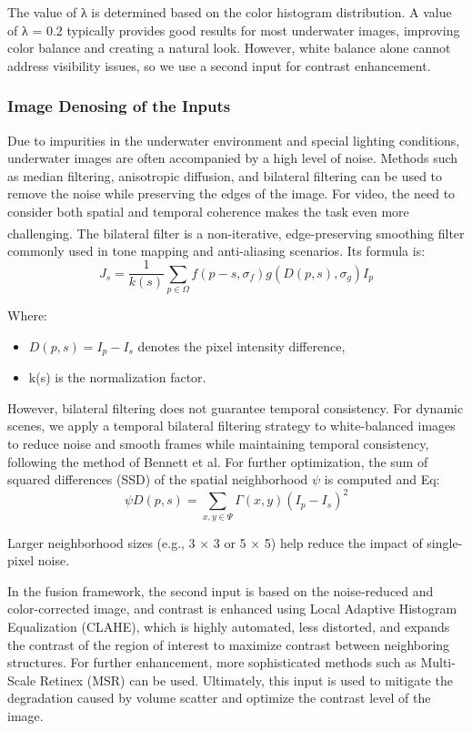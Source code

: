 \documentclass[withoutpreface,bwprint]{cumcmthesis}
\begin{document}
The value of λ is determined based on the color histogram distribution. A value of λ = 0.2 typically provides good results for most underwater images, improving color balance and creating a natural look. However, white balance alone cannot address visibility issues, so we use a second input for contrast enhancement.

\subsubsection{Image Denosing of the Inputs}

Due to impurities in the underwater environment and special lighting conditions, underwater images are often accompanied by a high level of noise. Methods such as median filtering, anisotropic diffusion, and bilateral filtering can be used to remove the noise while preserving the edges of the image. For video, the need to consider both spatial and temporal coherence makes the task even more challenging. The bilateral filter\textsuperscript{\cite{elad2002origin}} is a non-iterative, edge-preserving smoothing filter commonly used in tone mapping and anti-aliasing scenarios. Its formula is:
\[J_{s}=\frac{1}{k(s)} \sum_{p \in \Omega} f\left(p-s, \sigma_{f}\right) g\left(D(p, s), \sigma_{g}\right) I_{p}\]

Where:

\begin{itemize}[itemindent=2em]
    \item $D(p,s)=I_{p}- I_{s}$ denotes the pixel intensity difference, 

    \item k(s) is the normalization factor.
\end{itemize}

However, bilateral filtering does not guarantee temporal consistency. For dynamic scenes, we apply a temporal bilateral filtering strategy to white-balanced images to reduce noise and smooth frames while maintaining temporal consistency, following the method of Bennett et al. For further optimization, the sum of squared differences (SSD) of the spatial neighborhood $\psi$ is computed and Eq:
\[\psi D(p, s)=\sum_{x, y \in \Psi} \Gamma(x, y)\left(I_{p}-I_{s}\right)^{2}\]

Larger neighborhood sizes (e.g., 3 × 3 or 5 × 5) help reduce the impact of single-pixel noise.

In the fusion framework, the second input is based on the noise-reduced and color-corrected image, and contrast is enhanced using Local Adaptive Histogram Equalization (CLAHE), which is highly automated, less distorted, and expands the contrast of the region of interest to maximize contrast between neighboring structures. For further enhancement, more sophisticated methods such as Multi-Scale Retinex (MSR) can be used. Ultimately, this input is used to mitigate the degradation caused by volume scatter and optimize the contrast level of the image.
\end{document}
